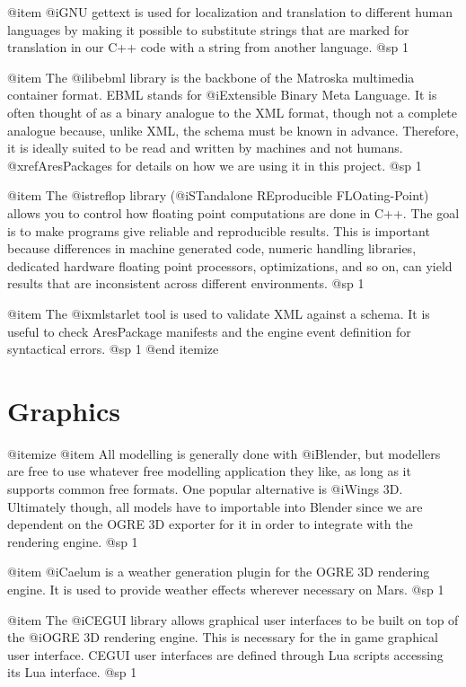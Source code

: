 @item
@i{GNU gettext} is used for localization and translation to different human languages by making it possible to substitute strings that are marked for translation in our C++ code with a string from another language.
@sp 1

@item
The @i{libebml} library is the backbone of the Matroska multimedia container format. EBML stands for @i{Extensible Binary Meta Language}. It is often thought of as a binary analogue to the XML format, though not a complete analogue because, unlike XML, the schema must be known in advance. Therefore, it is ideally suited to be read and written by machines and not humans. @xref{AresPackages} for details on how we are using it in this project.
@sp 1

@item
The @i{streflop} library (@i{STandalone REproducible FLOating-Point}) allows you to control how floating point computations are done in C++. The goal is to make programs give reliable and reproducible results. This is important because differences in machine generated code, numeric handling libraries, dedicated hardware floating point processors, optimizations, and so on, can yield results that are inconsistent across different environments.
@sp 1

@item
The @i{xmlstarlet} tool is used to validate XML against a schema. It is useful to check AresPackage manifests and the engine event definition for syntactical errors.
@sp 1
@end itemize


\section{Graphics}

@itemize
@item
All modelling is generally done with @i{Blender}, but modellers are free to use whatever free modelling application they like, as long as it supports common free formats. One popular alternative is @i{Wings 3D}. Ultimately though, all models have to importable into Blender since we are dependent on the OGRE 3D exporter for it in order to integrate with the rendering engine.
@sp 1

@item
@i{Caelum} is a weather generation plugin for the OGRE 3D rendering engine. It is used to provide weather effects wherever necessary on Mars.
@sp 1

@item
The @i{CEGUI} library allows graphical user interfaces to be built on top of the @i{OGRE 3D} rendering engine. This is necessary for the in game graphical user interface. CEGUI user interfaces are defined through Lua scripts accessing its Lua interface.
@sp 1

